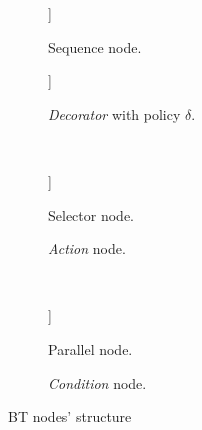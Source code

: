 \documentclass[a4paper,UKenglish,cleveref, autoref, thm-restate]{oasics-v2019}
\begin{document}
\begin{figure}[H]
    \begin{subfigure}{.5\textwidth}
        \centering
        \captionsetup{justification=centering}
        \begin{behavior}
            [\sequence
                [\action{Child 1}]
                [{\textbf{. . .}}, inner sep=10pt]
                [\action{Child N}]
            ]
        \end{behavior}
        \caption{Sequence node.}
        \label{fig:sequence}
    \end{subfigure}%
    \begin{subfigure}{.5\textwidth}
        \centering
        \captionsetup{justification=centering}
        \begin{behavior}
            [\decorator{$\delta$},
                [\action{Child}]
            ]
        \end{behavior}
        \caption{\textit{Decorator} with policy $\delta$.}
        \label{fig:decorator}
    \end{subfigure}\\
    \begin{subfigure}{.5\textwidth}
        \centering
        \captionsetup{justification=centering}
        \begin{behavior}
            [\selector
                [\action{Child 1}]
                [{\textbf{. . .}}, inner sep=10pt]
                [\action{Child N}]
            ]
        \end{behavior}
        \caption{Selector node.}
        \label{fig:selector}
    \end{subfigure}%
    \begin{subfigure}{.5\textwidth}
        \centering
        \captionsetup{justification=centering}
        \begin{behavior}
        \end{behavior}
        \caption{\textit{Action} node.}
        \label{fig:action}
    \end{subfigure}\\
    \begin{subfigure}{.5\textwidth}
        \centering
        \captionsetup{justification=centering}
        \begin{behavior}
            [\parallel{M}
                [\action{Child 1}]
                [{\textbf{. . .}}, inner sep=10pt]
                [\action{Child N}]
            ]
        \end{behavior}
        \caption{Parallel node.}
        \label{fig:parallel}
    \end{subfigure}%
    \begin{subfigure}{.5\textwidth}
        \centering
        \captionsetup{justification=centering}
        \begin{behavior}
        \end{behavior}
        \caption{\textit{Condition} node.}
        \label{fig:condition}
    \end{subfigure}

    \caption{BT nodes' structure}
\end{figure}
\end{document}
